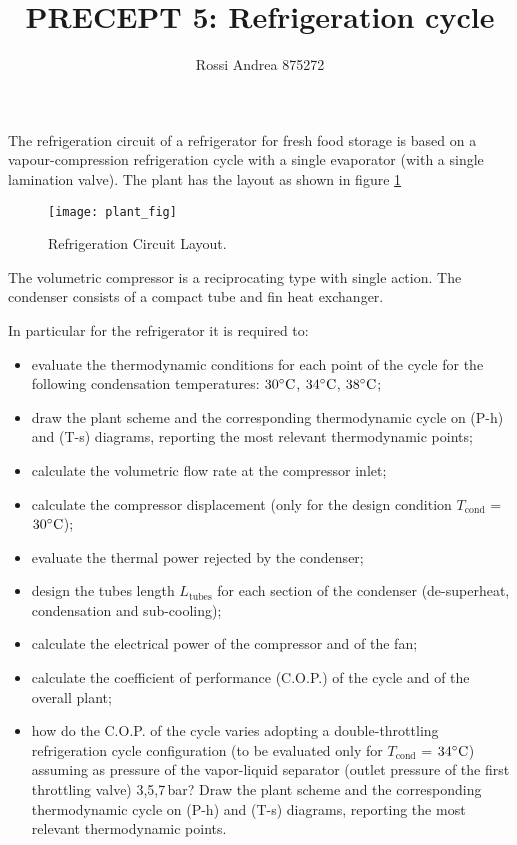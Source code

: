 \documentclass[a4paper,12pt]{article}
\title{PRECEPT 5: Refrigeration cycle}
\author{Rossi Andrea 875272}
\date{}
\newcommand{\Lt}[1][\,]{L^{#1}_{\text{tubes}}}
\newcommand{\Tcond}{T_{\text{cond}}}
\begin{document}
\maketitle

The refrigeration circuit of a refrigerator for fresh food storage is based on a vapour-compression refrigeration cycle with a single evaporator (with a single lamination valve). The plant has the layout as shown in figure \ref{fig:plant}
\begin{figure}[h]
  \caption{Refrigeration Circuit Layout.}
  \label{fig:plant}
  \centering
    \texttt{[image: plant\_fig]}
\end{figure}

The volumetric compressor is a reciprocating type with single action. 
The condenser consists of a compact tube and fin heat exchanger.

In particular for the refrigerator it is required to: 
\begin{itemize}
\item evaluate the thermodynamic conditions for each point of the cycle for the following condensation temperatures: $30\celsius$, $34\celsius$, $38\celsius$; 
\item draw the plant scheme and the corresponding thermodynamic cycle on (P-h) and (T-s) diagrams, reporting the most relevant thermodynamic points; 
\item calculate the volumetric flow rate at the compressor inlet;
\item calculate the compressor displacement (only for the design condition $\Tcond$ = $30\celsius$);
\item evaluate the thermal power rejected by the condenser; 
\item design the tubes length $\Lt$ for each section of the condenser (de-superheat, condensation and sub-cooling); 
\item calculate the electrical power of the compressor and of the fan; 
\item calculate the coefficient of performance (C.O.P.) of the cycle and of the overall plant;
\item how do the C.O.P. of the cycle varies adopting a double-throttling refrigeration cycle configuration (to be evaluated only for $\Tcond$ = $34\celsius$) assuming as pressure of the vapor-liquid separator (outlet pressure of the first throttling valve) 3,5,7\,bar? Draw the plant scheme and the corresponding thermodynamic cycle on (P-h) and (T-s) diagrams, reporting the most relevant thermodynamic points. 
\end{itemize}
\end{document}
